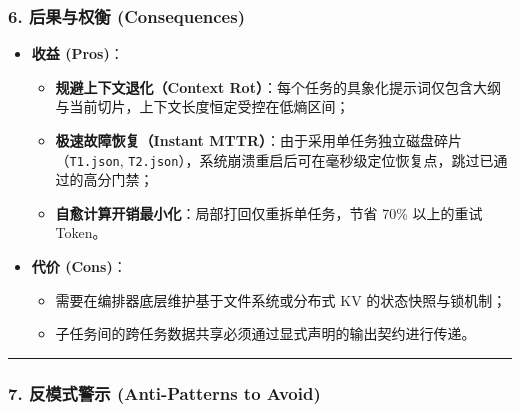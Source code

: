 \documentclass[
]{ctexart}
\providecommand{\tightlist}{%
  \setlength{\itemsep}{0pt}\setlength{\parskip}{0pt}}
\renewcommand{\_}{\discretionary{}{}{\textunderscore}}
\begin{document}
\subsubsection{6. 后果与权衡
(Consequences)}\label{ux540eux679cux4e0eux6743ux8861-consequences-5}

\begin{itemize}
\tightlist
\item
  \textbf{收益 (Pros)}：

  \begin{itemize}
  \tightlist
  \item
    \textbf{规避上下文退化（Context
    Rot）}：每个任务的具象化提示词仅包含大纲与当前切片，上下文长度恒定受控在低熵区间；
  \item
    \textbf{极速故障恢复（Instant
    MTTR）}：由于采用单任务独立磁盘碎片（\texttt{T1.json},
    \texttt{T2.json}），系统崩溃重启后可在毫秒级定位恢复点，跳过已通过的高分门禁；
  \item
    \textbf{自愈计算开销最小化}：局部打回仅重拆单任务，节省 70\%
    以上的重试 Token。
  \end{itemize}
\item
  \textbf{代价 (Cons)}：

  \begin{itemize}
  \tightlist
  \item
    需要在编排器底层维护基于文件系统或分布式 KV 的状态快照与锁机制；
  \item
    子任务间的跨任务数据共享必须通过显式声明的输出契约进行传递。
  \end{itemize}
\end{itemize}

\begin{center}\rule{0.5\linewidth}{0.5pt}\end{center}

\subsubsection{7. 反模式警示 (Anti-Patterns to
Avoid)}\label{ux53cdux6a21ux5f0fux8b66ux793a-anti-patterns-to-avoid-5}
\end{document}
